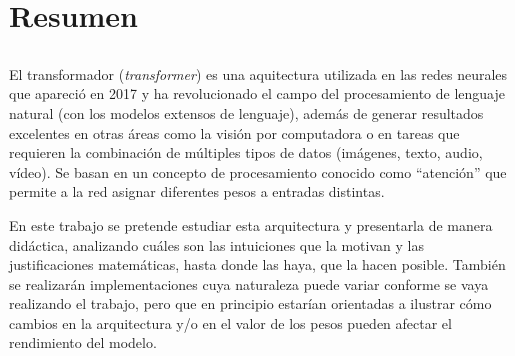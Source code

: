 \chapter*{Resumen}

\section*{\tituloPortadaVal}

El transformador (\textit{transformer}) es una aquitectura utilizada en las redes neurales que
apareció en 2017 y ha revolucionado el campo del procesamiento de lenguaje natural (con los
modelos extensos de lenguaje), además de generar resultados excelentes en otras áreas como
la visión por computadora o en tareas que requieren la combinación de múltiples tipos de datos
(imágenes, texto, audio, vídeo). Se basan en un concepto de procesamiento conocido como
“atención” que permite a la red asignar diferentes pesos a entradas distintas.


En este trabajo se pretende estudiar esta arquitectura y presentarla de manera didáctica,
analizando cuáles son las intuiciones que la motivan y las justificaciones matemáticas, hasta
donde las haya, que la hacen posible. También se realizarán implementaciones cuya naturaleza
puede variar conforme se vaya realizando el trabajo, pero que en principio estarían orientadas a
ilustrar cómo cambios en la arquitectura y/o en el valor de los pesos pueden afectar el
rendimiento del modelo.



   


